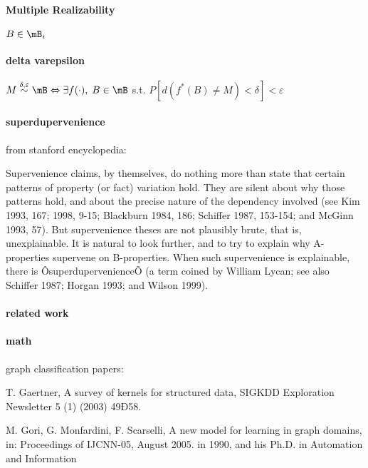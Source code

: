 \paragraph{Multiple Realizability}

$B \in \mB_i$

\paragraph{delta varepsilon}

$M \overset{\delta,\varepsilon}{\sim} \mB \Leftrightarrow \exists f(\cdot), \; B \in \mB$ s.t. $P[d(f^\ast(B)\neq M)< \delta]< \varepsilon$

\paragraph{superdupervenience}

from stanford encyclopedia:

Supervenience claims, by themselves, do nothing more than state that certain patterns of property (or fact) variation hold. They are silent about why those patterns hold, and about the precise nature of the dependency involved (see Kim 1993, 167; 1998, 9-15; Blackburn 1984, 186; Schiffer 1987, 153-154; and McGinn 1993, 57). But supervenience theses are not plausibly brute, that is, unexplainable. It is natural to look further, and to try to explain why A-properties supervene on B-properties. When such supervenience is explainable, there is ÔsuperdupervenienceÕ (a term coined by William Lycan; see also Schiffer 1987; Horgan 1993; and Wilson 1999).

\newpage
\paragraph{related work}

\paragraph{math}


graph classification papers: \cite{KashimaInokuchi02, KudoMatsumoto04, Emmert-StreibKilian05, PredictingStructuredData07, BunkeRiesen08, SaigoTsuda09, TrentinIorio09, ZaslavskiyVert08, BunkeRiesen08, RiesenBunke09}

T. Gaertner, A survey of kernels for structured data, SIGKDD Exploration Newsletter 5 (1) (2003) 49Ð58.

M. Gori, G. Monfardini, F. Scarselli, A new model for learning in graph domains, in: Proceedings of IJCNN-05, August 2005. in 1990, and his Ph.D. in Automation and Information

